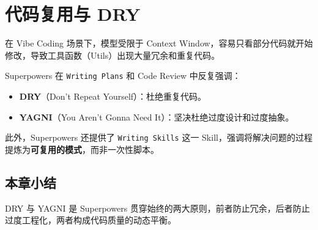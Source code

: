\section{代码复用与 DRY}

在 Vibe Coding 场景下，模型受限于 Context Window，容易只看部分代码就开始修改，导致工具函数（Utils）出现大量冗余和重复代码。

Superpowers 在 \texttt{Writing Plans} 和 Code Review 中反复强调：

\begin{itemize}
    \item \textbf{DRY}（Don't Repeat Yourself）：杜绝重复代码。
    \item \textbf{YAGNI}（You Aren't Gonna Need It）：坚决杜绝过度设计和过度抽象。
\end{itemize}

此外，Superpowers 还提供了 \texttt{Writing Skills} 这一 Skill，强调将解决问题的过程提炼为\textbf{可复用的模式}，而非一次性脚本。

\subsection{本章小结}

DRY 与 YAGNI 是 Superpowers 贯穿始终的两大原则，前者防止冗余，后者防止过度工程化，两者构成代码质量的动态平衡。


